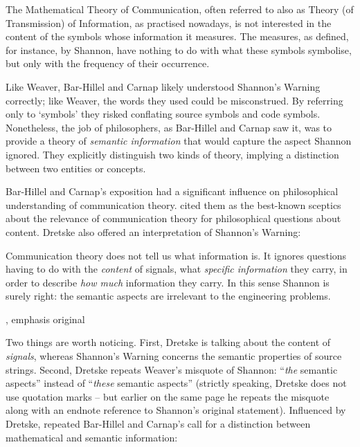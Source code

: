 \begin{myquote}
The Mathematical Theory of Communication, often referred to also as Theory (of Transmission) of Information, as practised nowadays, is not interested in the content of the symbols whose information it measures. The measures, as defined, for instance, by Shannon, have nothing to do with what these symbols symbolise, but only with the frequency of their occurrence.
\par\hspace*{\fill}\citet[147]{bar-hillel1953semantic}
\end{myquote}

\noindent Like Weaver, Bar-Hillel and Carnap likely understood {\sc Shannon's Warning} correctly; like Weaver, the words they used could be misconstrued.
By referring only to `symbols' they risked conflating source symbols and code symbols.
Nonetheless, the job of philosophers, as Bar-Hillel and Carnap saw it, was to provide a theory of \textit{semantic information} that would capture the aspect Shannon ignored.
They explicitly distinguish two kinds of theory, implying a distinction between two entities or concepts.

Bar-Hillel and Carnap's exposition had a significant influence on philosophical understanding of communication theory.
\citet[p. 241, n.
1]{dretske1981knowledge} cited them as the best-known sceptics about the relevance of communication theory for philosophical questions about content.
Dretske also offered an interpretation of {\sc Shannon's Warning}:

\begin{myquote}
Communication theory does not tell us what information is.
It ignores questions having to do with the \emph{content} of signals, what \emph{specific information} they carry, in order to describe \emph{how much} information they carry.
In this sense Shannon is surely right: the semantic aspects are irrelevant to the engineering problems.
\par\hspace*{\fill}\citet[41]{dretske1981knowledge}, emphasis original
\end{myquote}

\noindent Two things are worth noticing.
First, Dretske is talking about the content of \textit{signals}, whereas {\sc Shannon's Warning} concerns the semantic properties of source strings.
Second, Dretske repeats Weaver's misquote of Shannon: ``\textit{the} semantic aspects'' instead of ``\textit{these} semantic aspects'' (strictly speaking, Dretske does not use quotation marks -- but earlier on the same page he repeats the misquote along with an endnote reference to Shannon's original statement).
Influenced by Dretske, \citet{dennett1983intentional} repeated Bar-Hillel and Carnap's call for a distinction between mathematical and semantic information:

